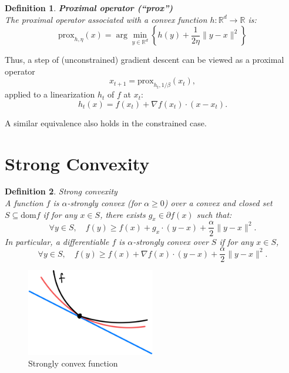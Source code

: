 \documentclass[11pt]{book} %
\newtheorem{definition}{Definition}[section]
\begin{document}
\begin{definition}{\textbf{Proximal operator (``prox'')}} \\
    The proximal operator associated with a convex function \( h \colon \mathbb{R}^d \rightarrow \mathbb{R} \) is:
    \[
    \text{prox}_{h,\eta}(x) = \arg\min_{y \in \mathbb{R}^d} \left\{ h(y) + \frac{1}{2\eta} \| y - x \|^2 \right\}
    \]
\end{definition}

Thus, a step of (unconstrained) gradient descent can be viewed as a proximal operator
\[
x_{t+1} = \text{prox}_{h_t, 1/\beta}(x_t),
\]
applied to a linearization \( h_t \) of \( f \) at \( x_t \):
\[
h_t(x) = f(x_t) + \nabla f(x_t) \cdot (x - x_t).
\]

A similar equivalence also holds in the constrained case.






\section{Strong Convexity}


\begin{definition} {Strong convexity} \\
A function \( f \) is \(\alpha\)-strongly convex (for \(\alpha \geq 0\)) over a convex and closed set \( S \subseteq \text{dom} f \) if for any \( x \in S \), there exists \( g_x \in \partial f(x) \) such that:
\[
\forall y \in S, \quad f(y) \geq f(x) + g_x \cdot (y - x) + \frac{\alpha}{2} \|y - x\|^2.
\]
In particular, a differentiable \( f \) is \(\alpha\)-strongly convex over \( S \) if for any \( x \in S \),
\[
\forall y \in S, \quad f(y) \geq f(x) + \nabla f(x) \cdot (y - x) + \frac{\alpha}{2} \|y - x\|^2.
\]
\end{definition}

\begin{figure}[H]
    \centering
    \includegraphics[width=0.5\textwidth]{Figs/strongly_convex.png}
    \caption{Strongly convex function}
\end{figure}
\end{document}

